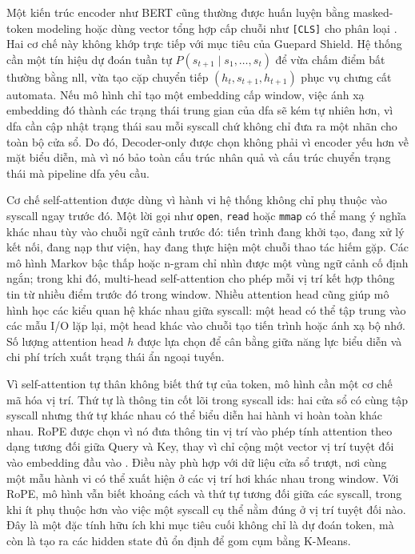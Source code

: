 \documentclass[../main.tex]{subfiles}
\begin{document}
Một kiến trúc encoder như BERT cũng thường được huấn luyện bằng
masked-token modeling
hoặc dùng vector tổng hợp cấp chuỗi như \texttt{[CLS]} cho phân loại
\cite{devlin2019bert}.
Hai cơ chế này không khớp trực tiếp với mục tiêu của Guepard Shield.
Hệ thống cần một
tín hiệu dự đoán tuần tự $P(s_{t+1}\mid s_1,\ldots,s_t)$ để vừa chấm
điểm bất thường
bằng \gls{nll}, vừa tạo cặp chuyển tiếp $(h_t, s_{t+1}, h_{t+1})$ phục vụ
chưng cất automata.
Nếu mô hình chỉ tạo một embedding cấp window, việc ánh xạ embedding
đó thành các trạng
thái trung gian của \gls{dfa} sẽ kém tự nhiên hơn, vì \gls{dfa} cần cập nhật
trạng thái sau mỗi
\gls{syscall} chứ không chỉ đưa ra một nhãn cho toàn bộ cửa sổ. Do đó,
Decoder-only được chọn
không phải vì encoder yếu hơn về mặt biểu diễn, mà vì nó bảo toàn cấu
trúc nhân quả và
cấu trúc chuyển trạng thái mà pipeline \gls{dfa} yêu cầu.

Cơ chế self-attention được dùng vì hành vi hệ thống không chỉ phụ
thuộc vào \gls{syscall}
ngay trước đó. Một lời gọi như \texttt{open}, \texttt{read} hoặc
\texttt{mmap} có thể
mang ý nghĩa khác nhau tùy vào chuỗi ngữ cảnh trước đó: tiến trình
đang khởi tạo, đang
xử lý kết nối, đang nạp thư viện, hay đang thực hiện một chuỗi thao
tác hiếm gặp. Các
mô hình Markov bậc thấp hoặc n-gram chỉ nhìn được một vùng ngữ cảnh
cố định ngắn; trong
khi đó, multi-head self-attention cho phép mỗi vị trí kết hợp thông
tin từ nhiều điểm
trước đó trong window. Nhiều attention head cũng giúp mô hình học các
kiểu quan hệ
khác nhau giữa \gls{syscall}: một head có thể tập trung vào các mẫu I/O lặp
lại, một head
khác vào chuỗi tạo tiến trình hoặc ánh xạ bộ nhớ. Số lượng attention
head $h$ được
lựa chọn để cân bằng giữa năng lực biểu diễn và chi phí trích
xuất trạng thái
ẩn ngoại tuyến.

Vì self-attention tự thân không biết thứ tự của token, mô hình cần
một cơ chế mã hóa
vị trí. Thứ tự là thông tin cốt lõi trong \gls{syscall} \gls{ids}: hai cửa sổ có
cùng tập \gls{syscall}
nhưng thứ tự khác nhau có thể biểu diễn hai hành vi hoàn toàn khác
nhau. RoPE được chọn
vì nó đưa thông tin vị trí vào phép tính attention theo dạng tương
đối giữa Query và
Key, thay vì chỉ cộng một vector vị trí tuyệt đối vào embedding đầu
vào \cite{su2024roformer}.
Điều này phù hợp với dữ liệu cửa sổ trượt, nơi cùng một mẫu hành vi
có thể xuất hiện
ở các vị trí hơi khác nhau trong window. Với RoPE, mô hình vẫn biết
khoảng cách và thứ
tự tương đối giữa các \gls{syscall}, trong khi ít phụ thuộc hơn vào việc
một \gls{syscall} cụ thể
nằm đúng ở vị trí tuyệt đối nào. Đây là một đặc tính hữu ích khi mục
tiêu cuối không
chỉ là dự đoán token, mà còn là tạo ra các hidden state đủ ổn định để
gom cụm bằng
K-Means.
\end{document}
